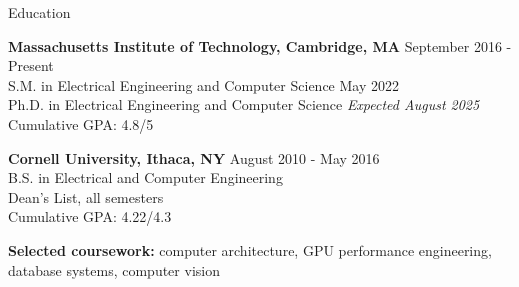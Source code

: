 \documentclass{resume} %
\begin{document}

%
%


\begin{rSection}{Education}

{\bf Massachusetts Institute of Technology, Cambridge, MA} \hfill { September 2016 - Present} \\ 
S.M. in Electrical Engineering and Computer Science \hfill {May 2022} \\
Ph.D. in Electrical Engineering and Computer Science \hfill { \it{Expected August 2025}} \\
Cumulative GPA: 4.8/5

{\bf Cornell University, Ithaca, NY} \hfill { August 2010 - May 2016} \\ 
B.S. in Electrical and Computer Engineering \\
Dean's List, all semesters \\
Cumulative GPA: 4.22/4.3 

{\bf Selected coursework:} computer architecture, GPU performance engineering, database systems, computer vision

\end{rSection}

\end{document}
